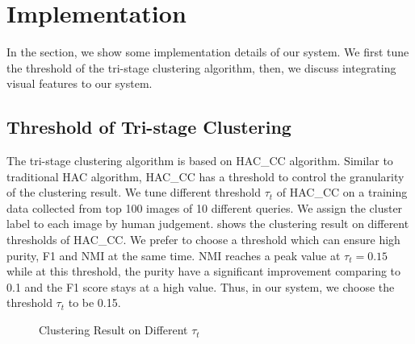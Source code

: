\section{Implementation}
\label{sec:implement}
In the section, we show some implementation details of our system.
We first tune the threshold of the tri-stage clustering algorithm,
then, we discuss integrating visual features to our system.

\subsection{Threshold of Tri-stage Clustering}
The tri-stage clustering algorithm is based on HAC\_CC
algorithm. Similar to traditional HAC algorithm, HAC\_CC has
a threshold to control the granularity of the clustering
result. We tune different threshold $\tau_t$ of HAC\_CC on a training
data collected from top 100 images of 10 different queries.
We assign the cluster label to each image by human judgement.
 shows the clustering result on
different thresholds of HAC\_CC.
We prefer to choose a threshold which can ensure high purity, F1 and NMI 
at the same time. NMI reaches a peak value at $\tau_t=0.15$ while at this threshold,
the purity have a significant improvement comparing to 0.1 and the
F1 score stays at a high value.
Thus, in our system, we choose the threshold $\tau_t$ to be 0.15.

\begin{figure}[th]
\centerline{}
	\caption{Clustering Result on Different $\tau_t$}
	\label{fig:thtri}
\end{figure}


